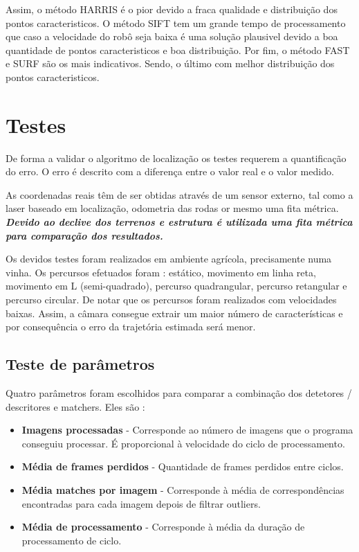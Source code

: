 Assim, o método HARRIS é o pior devido a fraca qualidade e distribuição dos pontos caracteristicos. O método SIFT tem um grande tempo de processamento que caso a velocidade do robô seja baixa é uma solução plausivel devido a boa quantidade de pontos caracteristicos e boa distribuição. Por fim, o método FAST e SURF são os mais indicativos. Sendo, o último com melhor distribuição  dos pontos caracteristicos. 


\section{Testes}

De forma a validar o algoritmo de localização os testes requerem a quantificação do erro. O erro é descrito com a diferença entre o valor real e o valor medido.

As coordenadas reais têm de ser obtidas através de um sensor externo, tal como a laser baseado em localização, odometria das rodas or mesmo uma fita métrica. \textbf{\textit{Devido ao declive dos terrenos e estrutura é utilizada uma fita métrica para comparação dos resultados.}}

Os devidos testes foram realizados em ambiente agrícola, precisamente numa vinha. Os percursos efetuados foram : estático, movimento em linha reta, movimento em L (semi-quadrado), percurso quadrangular, percurso retangular e percurso circular. De notar que os percursos foram realizados com velocidades baixas. Assim, a câmara consegue extrair um maior número de características e por consequência o erro da trajetória estimada será menor.  


\subsection{Teste de parâmetros}

Quatro parâmetros foram escolhidos para comparar a combinação dos detetores / descritores e matchers. Eles são :

\begin{itemize}
	\item \textbf{Imagens processadas} - Corresponde ao número de imagens que o programa conseguiu processar. É proporcional à velocidade do ciclo de processamento.
	\item \textbf{Média de frames perdidos} - Quantidade de frames perdidos entre ciclos.
	\item \textbf{Média matches por imagem} - Corresponde à média de correspondências encontradas para cada imagem depois de filtrar outliers.
	\item \textbf{Média de processamento} - Corresponde à média da duração de processamento de ciclo.
\end{itemize}


